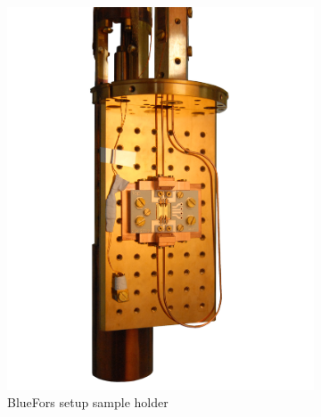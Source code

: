\begin{figure}
     \centering
     \begin{subfigure}[b]{.45\textwidth}
         \centering
         \includegraphics[width=\textwidth]{setup/holder/BF_freecut_45.jpg}
         \caption{BlueFors setup sample holder}
         \label{fig:setup_photo_bluefors}
     \end{subfigure}
     \begin{subfigure}[b]{.45\textwidth}
         \centering

\end{subfigure}
\end{figure}
